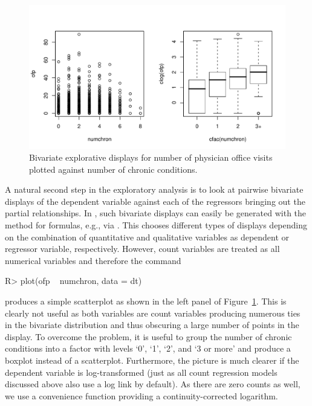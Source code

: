 \documentclass{Z}
\newcommand{\fct}[1]{\code{#1()}}
\begin{document}
\begin{figure}[p]
\begin{center}
\includegraphics{countreg-bad-good}
\caption{\label{fig:bad-good} Bivariate explorative displays for number of physician office visits
  plotted against number of chronic conditions.}
\end{center}
\end{figure}

A natural second step in the exploratory analysis is to look at pairwise bivariate 
displays of the dependent variable against each of the regressors bringing out the
partial relationships. In , such bivariate displays
can easily be generated with the \fct{plot} method for formulas, e.g., via .
This chooses different types of displays depending on the combination of quantitative
and qualitative variables as dependent or regressor variable, respectively. However,
count variables are treated as all numerical variables and therefore the command

\begin{Schunk}
\begin{Sinput}
R> plot(ofp ~ numchron, data = dt)
\end{Sinput}
\end{Schunk}

produces a simple scatterplot as shown in the left panel of Figure~\ref{fig:bad-good}.
This is clearly not useful as both variables are count variables producing numerous
ties in the bivariate distribution and thus obscuring a large number of points in
the display. To overcome the problem, it is useful to group the number of chronic
conditions into a factor with levels `0', `1', `2', and `3 or more' and produce a
boxplot instead of a scatterplot. Furthermore, the picture is much clearer if the
dependent variable is log-transformed (just as all count regression models discussed
above also use a log link by default). As there are zero counts as well, we use a
convenience function \fct{clog} providing a continuity-corrected logarithm.
\end{document}
